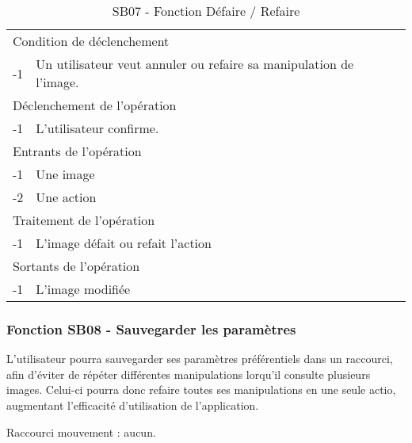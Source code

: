 \documentclass[a4paper]{article}
\begin{document}
\begin{table}[H]
  \centering
   \small
	\begin{tabular}{|c|p{12cm}|}
   		\hline
   			\rowcolor{lightgray}\multicolumn{2}{|c|}{\textbf{SB07 - Fonction Défaire / Refaire}} \\
   		\hline
   			\multicolumn{2}{|l|}{Condition de d\'eclenchement} \\
   		\hline
   			-1 & Un utilisateur veut annuler ou refaire sa manipulation de l'image. \\
   		\hline
   			\multicolumn{2}{|l|}{D\'eclenchement de l'op\'eration} \\
   		\hline
   			-1 & L'utilisateur confirme. \\
   		\hline
   			\multicolumn{2}{|l|}{Entrants de l'op\'eration} \\
   		\hline
        	-1 & Une image \\
   			-2 & Une action \\ 	
        \hline
   			\multicolumn{2}{|l|}{Traitement de l'op\'eration} \\
  		\hline
   			-1 & L'image défait ou refait l'action \\
   		\hline
   			\multicolumn{2}{|l|}{Sortants de l'op\'eration} \\
   		\hline
   			-1 & L'image modifiée \\
   		\hline
	\end{tabular}
  \caption{SB07 - Fonction Défaire / Refaire}
  \normalsize
  \label{tab:visu_img_undo_redo}
\end{table}



\subsubsection{Fonction SB08 - Sauvegarder les paramètres}

L'utilisateur pourra sauvegarder ses paramètres préférentiels dans un raccourci, afin d'éviter de répéter différentes manipulations lorqu'il consulte plusieurs images. Celui-ci pourra donc refaire toutes ses manipulations en une seule actio, augmentant l'efficacité d'utilisation de l'application.

Raccourci mouvement : aucun.
\end{document}
